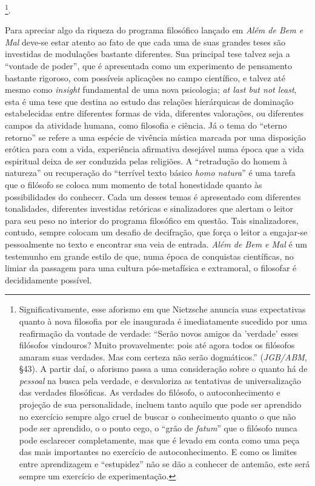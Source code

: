 \documentclass[
	12pt,				%
	openright,			%
	oneside,			%
	a4paper,			%
	english,			%
	french,				%
	spanish,			%
	brazil				%
	]{abntex2}
\begin{document}
\footnote{Significativamente, esse aforismo em que Nietzsche anuncia suas expectativas quanto à nova filosofia por ele inaugurada é imediatamente sucedido por uma reafirmação da vontade de verdade: “Serão novos amigos da 'verdade' esses filósofos vindouros? Muito provavelmente: pois até agora todos os filósofos amaram suas verdades. Mas com certeza não serão dogmáticos.” (\textit{JGB/ABM}, §43). A partir daí, o aforismo passa a uma consideração sobre o quanto há de \textit{pessoal} na busca pela verdade, e desvaloriza as tentativas de universalização das verdades filosóficas. As verdades do filósofo, o autoconhecimento e projeção de sua personalidade, incluem tanto aquilo que pode ser aprendido no exercício sempre algo cruel de buscar o conhecimento quanto o que não pode ser aprendido, o o ponto cego, o “grão de \textit{fatum}” que o filósofo nunca pode esclarecer completamente, mas que é levado em conta como uma peça das mais importantes no exercício de autoconhecimento. E como os limites entre aprendizagem e “estupidez” não se dão a conhecer de antemão, este será sempre um exercício de experimentação.}. 

Para apreciar algo da riqueza do programa filosófico lançado em \textit{Além de Bem e Mal} deve-se estar atento ao fato de que cada uma de suas grandes teses são investidas de modulações bastante diferentes. Sua principal tese talvez seja a “vontade de poder”, que é apresentada como um experimento de pensamento bastante rigoroso, com possíveis aplicações no campo científico, e talvez até mesmo como \textit{insight} fundamental de uma nova psicologia; \textit{at last but not least}, esta é uma tese que destina ao estudo das relações hierárquicas de dominação estabelecidas entre diferentes formas de vida, diferentes valorações, ou diferentes campos da atividade humana, como filosofia e ciência. Já o tema do “eterno retorno” se refere a uma espécie de vivência mística marcada por uma disposição erótica para com a vida, experiência afirmativa desejável numa época que a vida espiritual deixa de ser conduzida pelas religiões. A “retradução do homem à natureza” ou recuperação do “terrível texto básico \textit{homo natura}” é uma tarefa que o filósofo se coloca num momento de total honestidade quanto às possibilidades do conhecer. Cada um desses temas é apresentado com diferentes tonalidades, diferentes investidas retóricas e sinalizadores que alertam o leitor para seu peso no interior do programa filosófico em questão. Tais sinalizadores, contudo, sempre colocam um desafio de decifração, que força o leitor a engajar-se pessoalmente no texto e encontrar sua veia de entrada. \textit{Além de Bem e Mal} é um testemunho em grande estilo de que, numa época de conquistas científicas, no limiar da passagem para uma cultura pós-metafísica e extramoral, o filosofar é decididamente possível.
\end{document}
